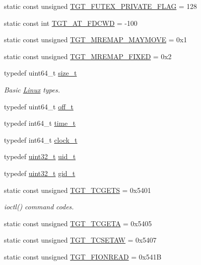 \begin{DoxyCompactItemize}
\item 
static const unsigned \hyperlink{classLinux_aac48b0673ec47bd265f960a40df8174a}{TGT\_\-FUTEX\_\-PRIVATE\_\-FLAG} = 128
\item 
static const int \hyperlink{classLinux_ac982d09ce88b29dcb1eb35091e2a6b5f}{TGT\_\-AT\_\-FDCWD} = -\/100
\item 
static const unsigned \hyperlink{classLinux_adf3fd76eea9d78e56cc53f77300e1b1d}{TGT\_\-MREMAP\_\-MAYMOVE} = 0x1
\item 
static const unsigned \hyperlink{classLinux_aebbe098e8d7b38f0b58663068ebb2215}{TGT\_\-MREMAP\_\-FIXED} = 0x2
\end{DoxyCompactItemize}
\label{_amgrpd41d8cd98f00b204e9800998ecf8427e}
 \begin{DoxyCompactItemize}
\item 
typedef uint64\_\-t \hyperlink{classLinux_a186ea1339bffb378854987065835afe3}{size\_\-t}
\begin{DoxyCompactList}\small\item\em Basic \hyperlink{classLinux}{Linux} types. \item\end{DoxyCompactList}\item 
typedef uint64\_\-t \hyperlink{classLinux_a2cb84cf5f02a29b7e8f237ff151a9225}{off\_\-t}
\item 
typedef int64\_\-t \hyperlink{classLinux_a7f5991675a84025dc7c24754a9b257c0}{time\_\-t}
\item 
typedef int64\_\-t \hyperlink{classLinux_a0001c50514d27f51d408e051dc803ad4}{clock\_\-t}
\item 
typedef \hyperlink{Type_8hh_a435d1572bf3f880d55459d9805097f62}{uint32\_\-t} \hyperlink{classLinux_af2306308627701b66dc6f3babe821ab4}{uid\_\-t}
\item 
typedef \hyperlink{Type_8hh_a435d1572bf3f880d55459d9805097f62}{uint32\_\-t} \hyperlink{classLinux_aa7352f1065fe606194d792e2b292cf83}{gid\_\-t}
\item 
static const unsigned \hyperlink{classLinux_a50e5d880569ec2cb9a2f3d4aaa55cc64}{TGT\_\-TCGETS} = 0x5401
\begin{DoxyCompactList}\small\item\em ioctl() command codes. \item\end{DoxyCompactList}\item 
static const unsigned \hyperlink{classLinux_a804fc265279c5dbd78e0f95da998b267}{TGT\_\-TCGETA} = 0x5405
\item 
static const unsigned \hyperlink{classLinux_a96e06e042526ea5e89c4e8a020636c52}{TGT\_\-TCSETAW} = 0x5407
\item 
static const unsigned \hyperlink{classLinux_a1def346ff527c8efccfd52463f3b5dc1}{TGT\_\-FIONREAD} = 0x541B
\end{DoxyCompactItemize}


